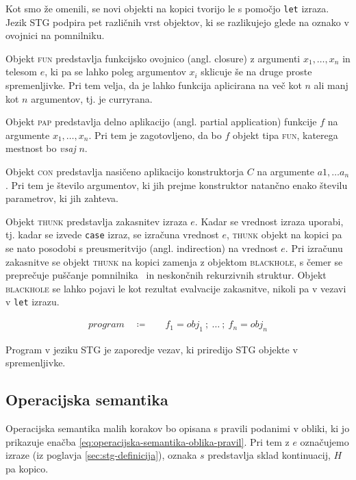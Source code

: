 Kot smo že omenili, se novi objekti na kopici tvorijo le s pomočjo \texttt{let} izraza. Jezik STG podpira pet različnih vrst objektov, ki se razlikujejo glede na oznako v ovojnici na pomnilniku.

Objekt \textsc{fun} predstavlja funkcijsko ovojnico (angl. closure) z argumenti $x_1, \dots, x_n$ in telesom $e$, ki pa se lahko poleg argumentov $x_i$ sklicuje še na druge proste spremenljivke. Pri tem velja, da je lahko funkcija aplicirana na več kot $n$ ali manj kot $n$ argumentov, tj. je curryrana.

Objekt \textsc{pap} predstavlja delno aplikacijo (angl. partial application) funkcije $f$ na argumente $x_1, \dots, x_n$. Pri tem je zagotovljeno, da bo $f$ objekt tipa \textsc{fun}, katerega mestnost bo \textit{vsaj} $n$.

Objekt \textsc{con} predstavlja nasičeno aplikacijo konstruktorja $C$ na argumente $a1, \dots a_n$. Pri tem je število argumentov, ki jih prejme konstruktor natančno enako številu parametrov, ki jih zahteva.

Objekt \textsc{thunk} predstavlja zakasnitev izraza $e$. Kadar se vrednost izraza uporabi, tj. kadar se izvede \texttt{case} izraz, se izračuna vrednost $e$, \textsc{thunk} objekt na kopici pa se nato posodobi s preusmeritvijo (angl. indirection) na vrednost $e$. Pri izračunu zakasnitve se objekt \textsc{thunk} na kopici zamenja z objektom \textsc{blackhole}, s čemer se preprečuje puščanje pomnilnika~\cite{jones1992tail} in neskončnih rekurzivnih struktur. Objekt \textsc{blackhole} se lahko pojavi le kot rezultat evalvacije zakasnitve, nikoli pa v vezavi v \texttt{let} izrazu.

\begin{align*}
	program \quad \coloneq& \quad f_1 = obj_1 \: ; \: \dots \: ; \: f_n = obj_n
\end{align*}

Program v jeziku STG je zaporedje vezav, ki priredijo STG objekte v spremenljivke.

\subsection{Operacijska semantika}

Operacijska semantika malih korakov bo opisana s pravili podanimi v obliki, ki jo prikazuje enačba \ref{eq:operacijska-semantika-oblika-pravil}. Pri tem z $e$ označujemo izraze (iz poglavja \ref{sec:stg-definicija}), oznaka $s$ predstavlja sklad kontinuacij, $H$ pa kopico.

